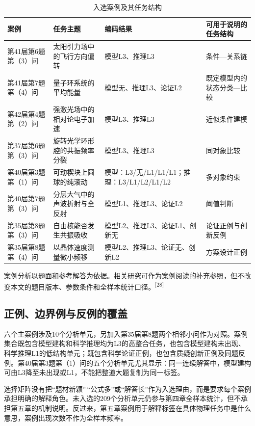 \documentclass[
  12pt,
  a4paper,twoside,openany]{ctexbook}
\renewcommand{\arraystretch}{1.22}
\begin{document}
\begin{table}[H]
\centering
\caption{入选案例及其任务结构}
\label{tab:third-edition-case-selection}
\footnotesize
\setlength{\tabcolsep}{3pt}
\renewcommand{\arraystretch}{1.05}
\begin{tabular}{p{2.4cm}p{3.2cm}p{4.7cm}p{2.9cm}}
\toprule
案例 & 任务主题 & 编码结果 & 可用于说明的任务结构 \\
\midrule
第41届第6题第（3）问 & 太阳引力场中的飞行方向偏转 & 模型L3、推理L3 & 条件—关系链 \\
第41届第7题第（4）问 & 量子环系统的平均能量 & 模型无、推理L3、论证L2 & 既定模型内的状态分类—比较 \\
第42届第4题第（2）问 & 强激光场中的相对论电子加速 & 模型L3、推理L3 & 近似条件建模 \\
第37届第6题第（3）问 & 旋转光学环形腔的共振频率分裂 & 模型L3、推理L3 & 同对象比较 \\
第40届第3题第（1）问 & 可动楔块上圆球的纯滚动 & 模型：L3/无/L1/L1/L1；推理：L3/L1/L2/L1/L2 & 多对象约束 \\
第40届第7题第（3）问 & 分层大气中的声波折射与全反射 & 模型L1、推理L3、论证L2 & 阈值判断 \\
第35届第8题第（3）问 & 自由核能否发生共振吸收 & 模型L2、推理L3、论证L1、创新无 & 论证正例与创新反例 \\
第35届第8题第（4）问 & 以晶体速度测量微小频移 & 模型L2、推理L3、论证无、创新L2 & 方案设计正例 \\
\bottomrule
\end{tabular}
\end{table}

案例分析以题面和参考解答为依据。相关研究可作为案例阅读的补充参照，但不改变本文的题目版本、参数条件和全样本统计口径。\textsuperscript{[28]}

\subsection{正例、边界例与反例的覆盖}\label{ux6b63ux4f8bux8fb9ux754cux4f8bux4e0eux53cdux4f8bux7684ux8986ux76d6}

六个主案例涉及10个分析单元，另加入第35届第8题两个相邻小问作为对照。案例集合既包含模型建构和科学推理均为L3的高整合任务，也包含模型建构未出现、科学推理L1的低结构单元；既包含科学论证正例，也包含质疑创新正例及同题反例。第40届第3题第（1）问的五个分析单元尤其显示：同一连续解答中，模型建构可由L3降至未出现或L1，不能把整道大题复制为同一标签。

选择矩阵没有把``题材新颖''\,``公式多''或``解答长''作为入选理由，而是要求每个案例承担明确的解释角色。未入选的209个分析单元仍参与第四章全样本统计，但不承担第五章的机制说明。反过来，第五章案例用于解释标签在具体物理任务中是什么意思，案例出现次数不作为全样本频率。
\end{document}
